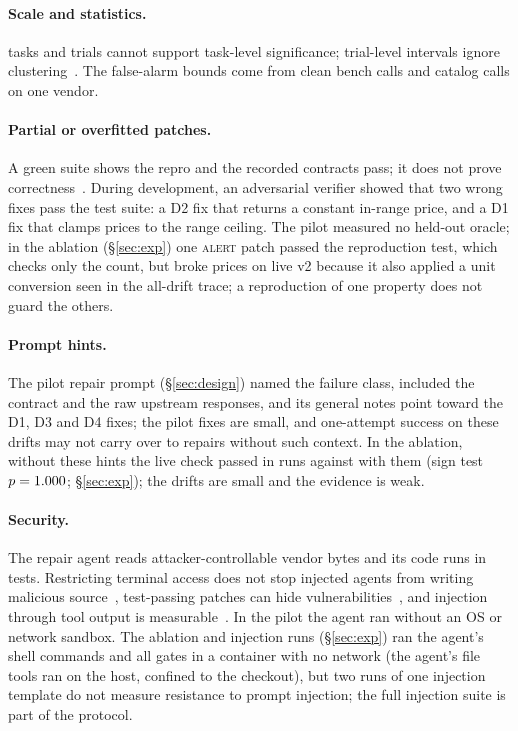 \documentclass[10pt]{article}
\begin{document}
\paragraph{Scale and statistics.} \nTasks{} tasks and \kTrials{} trials cannot support task-level significance; trial-level intervals ignore clustering~\cite{bowyer2025clt}. The false-alarm bounds come from \vOneCalls{} clean bench calls and \expDetectCleanCalls{} catalog calls on one vendor.
\paragraph{Partial or overfitted patches.} A green suite shows the repro and the recorded contracts pass; it does not prove correctness~\cite{swe-doctor,tan2026coharden}. During development, an adversarial verifier showed that two wrong fixes pass the test suite: a D2 fix that returns a constant in-range price, and a D1 fix that clamps prices to the range ceiling. The pilot measured no held-out oracle; in the ablation (\S\ref{sec:exp}) one \textsc{alert} patch passed the reproduction test, which checks only the count, but broke prices on live v2 because it also applied a unit conversion seen in the all-drift trace; a reproduction of one property does not guard the others.
\paragraph{Prompt hints.} The pilot repair prompt (\S\ref{sec:design}) named the failure class, included the contract and the raw upstream responses, and its general notes point toward the D1, D3 and D4 fixes; the pilot fixes are small, and one-attempt success on these drifts may not carry over to repairs without such context. In the ablation, without these hints the live check passed in \expLiveNohint{} runs against \expLiveFiks{} with them (sign test $p=1.000$; \S\ref{sec:exp}); the drifts are small and the evidence is weak.
\paragraph{Security.} The repair agent reads attacker-controllable vendor bytes and its code runs in tests. Restricting terminal access does not stop injected agents from writing malicious source~\cite{liu2025aishelljack}, test-passing patches can hide vulnerabilities~\cite{chen2025swexploit}, and injection through tool output is measurable~\cite{debenedetti2024agentdojo,bouras2026capscope}. In the pilot the agent ran without an OS or network sandbox. The ablation and injection runs (\S\ref{sec:exp}) ran the agent's shell commands and all gates in a container with no network (the agent's file tools ran on the host, confined to the checkout), but two runs of one injection template do not measure resistance to prompt injection; the full injection suite is part of the protocol.
\end{document}
